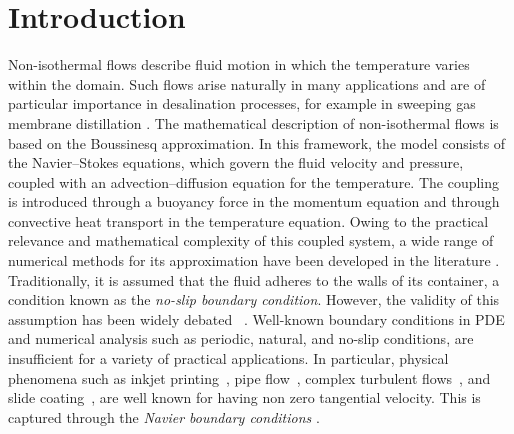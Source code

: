 \documentclass[10pt,a4paper]{article}
\begin{document}
\section{Introduction}
Non-isothermal flows describe fluid motion in which the temperature varies within the domain. Such flows arise naturally in many applications and are of particular importance in desalination processes, for example in sweeping gas membrane distillation \cite{Perfilov2018}. The mathematical description of non-isothermal flows is based on the Boussinesq approximation. In this framework, the model consists of the Navier–Stokes equations, which govern the fluid velocity and pressure, coupled with an advection–diffusion equation for the temperature. The coupling is introduced through a buoyancy force in the momentum equation and through convective heat transport in the temperature equation. Owing to the practical relevance and mathematical complexity of this coupled system, a wide range of numerical methods for its approximation have been developed in the literature  \cite{MR3649317, MR2947652, MR3913622, MR3918673, MR2111747, MR4489621}. Traditionally, it is assumed that the fluid adheres to the walls of its container, a condition known as the \textit{no-slip boundary condition}. However, the validity of this assumption has been widely debated ~\cite{gerard2015influence,goldstein1938modern}. Well-known boundary conditions in PDE and numerical analysis such as periodic, natural, and no-slip conditions, are insufficient for a variety of practical applications. In particular, physical phenomena such as inkjet printing~\cite{MR3179782}, pipe flow~\cite{berg2008two}, complex turbulent flows~\cite{MR1753115}, and slide coating~\cite{christodoulou1989fluid}, are well known for having non zero tangential velocity. This is captured through the \textit{Navier boundary conditions} \cite{berselli2010some}. 
\end{document}
